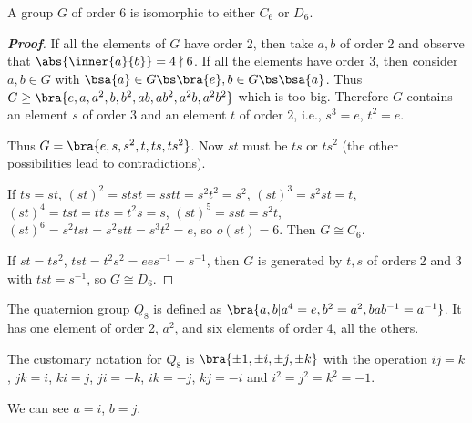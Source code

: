 
\begin{lemma}\label{lem:group_order_6}
A group $G$ of order 6 is isomorphic to either $C_6$ or $D_6$.
\end{lemma}

\begin{proof}[\bf Proof]
If all the elements of $G$ have order 2, then take $a,b$ of order 2 and observe that $\abs{\inner{a}{b}}=4\nmid 6$. If all the elements have order 3, then consider $a,b\in G$ with $\bsa{a} \in G\bs \bra{e}, b\in G\bs \bsa{a}$. Thus $G\geq \bra{e,a,a^2,b,b^2,ab,ab^2,a^2b,a^2b^2}$ which is too big. Therefore $G$ contains an element $s$ of order 3 and an element $t$ of order 2, i.e., $s^3 = e$, $t^2 = e$.

Thus $G=\bra{e,s,s^2,t,ts,ts^2}$. Now $st$ must be $ts$ or $ts^2$ (the other possibilities lead to contradictions).

If $ts=st$, $(st)^2 = stst = sstt = s^2 t^2 = s^2$, $(st)^3 = s^2 st = t$, $(st)^4 = tst = tts = t^2 s = s$, $(st)^5 = s st = s^2 t$, $(st)^6 = s^2 tst = s^2 s t t = s^3 t^2 = e$, so $o(st) = 6$. Then $G\cong C_6$.

If $st=ts^2$, $tst = t^2 s^{2} = e e s^{-1} =s^{-1}$, then $G$ is generated by $t,s$ of orders 2 and 3 with $tst = s^{-1}$, so $G\cong D_6$.
\end{proof}


\begin{definition}
The quaternion group $Q_8$ is defined as $\bra{a,b|a^4 = e,b^2 = a^2, bab^{-1} = a^{-1}}$. It has one element of order 2, $a^2$, and six elements of order 4, all the others.

The customary notation for $Q_8$ is $\bra{\pm 1,\pm i,\pm j,\pm k}$ with the operation $ij = k$, $jk =i$, $ki = j$, $ji = -k$, $ik = -j$, $kj = -i$ and $i^2 = j^2 = k^2 = -1$.%
\end{definition}

\begin{remark}
We can see $a=i$, $b=j$.
\end{remark}

